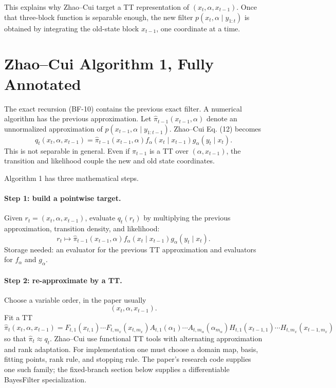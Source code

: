 \documentclass[11pt]{article}
\begin{document}
This explains why Zhao--Cui target a TT representation of
\((x_t,\alpha,x_{t-1})\).  Once that three-block function is separable enough,
the new filter \(p(x_t,\alpha\mid y_{1:t})\) is obtained by integrating the
old-state block \(x_{t-1}\), one coordinate at a time.

\section{Zhao--Cui Algorithm 1, Fully Annotated}

The exact recursion (BF-10) contains the previous exact filter.  A numerical
algorithm has the previous approximation.  Let
\(\widehat\pi_{t-1}(x_{t-1},\alpha)\) denote an unnormalized approximation of
\(p(x_{t-1},\alpha\mid y_{1:t-1})\).  Zhao--Cui Eq. (12) becomes
\[
    q_t(x_t,\alpha,x_{t-1})
    =
    \widehat\pi_{t-1}(x_{t-1},\alpha)
    f_\alpha(x_t\mid x_{t-1})
    g_\alpha(y_t\mid x_t).
    \tag{A1-1}
\]
This is not separable in general.  Even if
\(\widehat\pi_{t-1}\) is a TT over \((\alpha,x_{t-1})\), the transition and
likelihood couple the new and old state coordinates.

Algorithm 1 has three mathematical steps.

\paragraph{Step 1: build a pointwise target.}
Given \(r_t=(x_t,\alpha,x_{t-1})\), evaluate \(q_t(r_t)\) by multiplying the
previous approximation, transition density, and likelihood:
\[
    r_t\mapsto
    \widehat\pi_{t-1}(x_{t-1},\alpha)
    f_\alpha(x_t\mid x_{t-1})
    g_\alpha(y_t\mid x_t).
\]
Storage needed: an evaluator for the previous TT approximation and evaluators
for \(f_\alpha\) and \(g_\alpha\).

\paragraph{Step 2: re-approximate by a TT.}
Choose a variable order, in the paper usually
\[
    (x_t,\alpha,x_{t-1}).
\]
Fit a TT
\[
    \widehat\pi_t(x_t,\alpha,x_{t-1})
    =
    F_{t,1}(x_{t,1})\cdots F_{t,m_x}(x_{t,m_x})
    A_{t,1}(\alpha_1)\cdots A_{t,m_\alpha}(\alpha_{m_\alpha})
    H_{t,1}(x_{t-1,1})\cdots H_{t,m_x}(x_{t-1,m_x})
    \tag{A1-2}
\]
so that \(\widehat\pi_t\approx q_t\).  Zhao--Cui use functional TT tools with
alternating approximation and rank adaptation.  For implementation one must
choose a domain map, basis, fitting points, rank rule, and stopping rule.  The
paper's research code supplies one such family; the fixed-branch section below
supplies a differentiable BayesFilter specialization.
\end{document}
